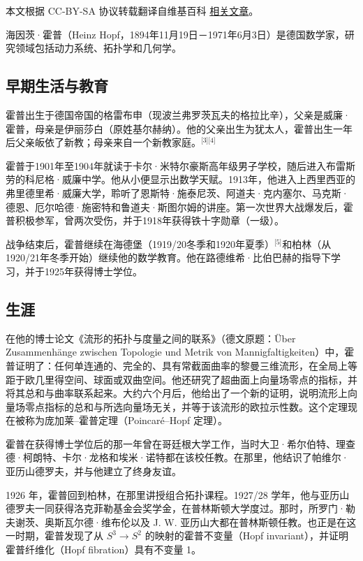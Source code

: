 
本文根据 CC-BY-SA 协议转载翻译自维基百科 \href{https://en.wikipedia.org/wiki/Heinz_Hopf}{相关文章}。

海因茨·霍普（Heinz Hopf，1894年11月19日－1971年6月3日）是德国数学家，研究领域包括动力系统、拓扑学和几何学。
\subsection{早期生活与教育}
霍普出生于德国帝国的格雷布申（现波兰弗罗茨瓦夫的格拉比辛），父亲是威廉·霍普，母亲是伊丽莎白（原姓基尔赫纳）。他的父亲出生为犹太人，霍普出生一年后父亲皈依了新教；母亲来自一个新教家庭。\(^\text{[3][4]}\)

霍普于1901年至1904年就读于卡尔·米特尔豪斯高年级男子学校，随后进入布雷斯劳的科尼格·威廉中学。他从小便显示出数学天赋。1913年，他进入上西里西亚的弗里德里希·威廉大学，聆听了恩斯特·施泰尼茨、阿道夫·克内塞尔、马克斯·德恩、厄尔哈德·施密特和鲁道夫·斯图尔姆的讲座。第一次世界大战爆发后，霍普积极参军，曾两次受伤，并于1918年获得铁十字勋章（一级）。

战争结束后，霍普继续在海德堡（1919/20冬季和1920年夏季）\(^\text{[5]}\)和柏林（从1920/21年冬季开始）继续他的数学教育。他在路德维希·比伯巴赫的指导下学习，并于1925年获得博士学位。
\subsection{生涯}
在他的博士论文《流形的拓扑与度量之间的联系》（德文原题：Über Zusammenhänge zwischen Topologie und Metrik von Mannigfaltigkeiten）中，霍普证明了：任何单连通的、完全的、具有常截面曲率的黎曼三维流形，在全局上等距于欧几里得空间、球面或双曲空间。他还研究了超曲面上向量场零点的指标，并将其总和与曲率联系起来。大约六个月后，他给出了一个新的证明，说明流形上向量场零点指标的总和与所选向量场无关，并等于该流形的欧拉示性数。这个定理现在被称为庞加莱–霍普定理（Poincaré–Hopf 定理）。

霍普在获得博士学位后的那一年曾在哥廷根大学工作，当时大卫·希尔伯特、理查德·柯朗特、卡尔·龙格和埃米·诺特都在该校任教。在那里，他结识了帕维尔·亚历山德罗夫，并与他建立了终身友谊。

1926 年，霍普回到柏林，在那里讲授组合拓扑课程。1927/28 学年，他与亚历山德罗夫一同获得洛克菲勒基金会奖学金，在普林斯顿大学度过。那时，所罗门·勒夫谢茨、奥斯瓦尔德·维布伦以及 J. W. 亚历山大都在普林斯顿任教。也正是在这一时期，霍普发现了从
$S^3 \to S^2$ 的映射的霍普不变量（Hopf invariant），并证明霍普纤维化（Hopf fibration）具有不变量 1。

